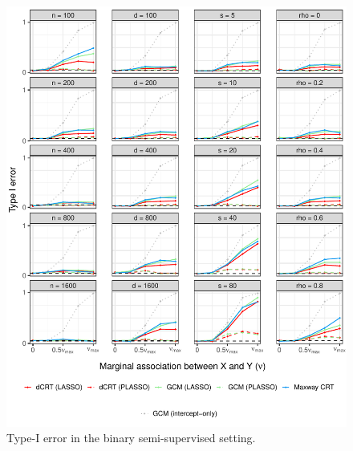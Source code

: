 \documentclass[aos]{imsart}
\theoremstyle{plain}
\theoremstyle{remark}
\begin{document}
\begin{figure}[!ht]
	\centering
	\includegraphics[width = \textwidth]{figures/binomial_semi_supervised_setting_null.pdf}
	\caption{Type-I error in the binary semi-supervised setting.}
	\label{fig:binomial_semi-supervised_null}
\end{figure}
\end{document}
